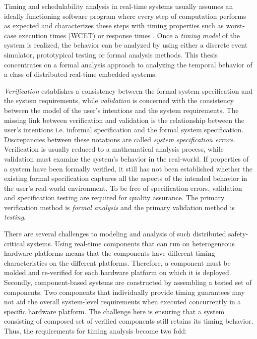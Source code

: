 Timing and schedulability analysis in real-time systems usually assumes an ideally functioning software program where every step of computation performs as expected and characterizes these steps with timing properties such as worst-case execution times (WCET) \cite{wilhelm2008worst} or response times \cite{joseph1986finding}. Once a \emph{timing model} of the system is realized, the behavior can be analyzed by using either a discrete event simulator, prototypical testing or formal analysis methods. This thesis concentrates on a formal analysis approach to analyzing the temporal behavior of a class of distributed real-time embedded systems.

\emph{Verification} establishes a consistency between the formal system specification and the system requirements, while \emph{validation} is concerned with the consistency between the model of the user's intentions and the system requirements. The missing link between verification and validation is the relationship between the user's intentions i.e. informal specification and the formal system specification. Discrepancies between these notations are called \emph{system specification errors}. Verification is usually reduced to a mathematical analysis process, while validation must examine the system's behavior in the real-world. If properties of a system have been formally verified, it still has not been established whether the existing formal specification captures all the aspects of the intended behavior in the user's real-world environment. To be free of specification errors, validation and specification testing are required for quality assurance. The primary verification method is \emph{formal analysis} and the primary validation method is \emph{testing}. 

There are several challenges to modeling and analysis of such distributed safety-critical systems. Using real-time components that can run on heterogeneous hardware platforms means that the components have different timing characteristics on the different platforms. Therefore, a component must be molded and re-verified for each hardware platform on which it is deployed. Secondly, component-based systems are constructed by assembling a tested set of components. Two components that individually provide timing guarantees may not aid the overall system-level requirements when executed concurrently in a specific hardware platform. The challenge here is ensuring that a system consisting of composed set of verified components still retains its timing behavior. Thus, the requirements for timing analysis become two fold: 

